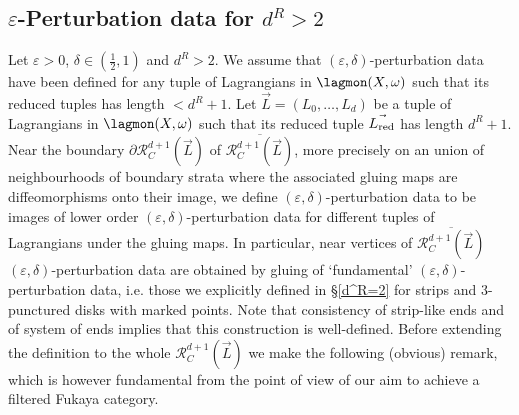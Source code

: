 	\subsection{$\varepsilon$-Perturbation data for $d^R>2$}\label{epspd3}
	Let $\varepsilon>0$, $\delta\in \left(\frac{1}{2},1\right)$ and $d^R>2$. We assume that $(\varepsilon,\delta)$-perturbation data have been defined for any tuple of Lagrangians in $\lagmon(X,\omega)$ such that its reduced tuples has length $<d^R+1$. Let $\vec{L}=(L_0,\ldots,L_d)$ be a tuple of Lagrangians in $\lagmon(X,\omega)$ such that its reduced tuple $\vec{L_\textnormal{red}}$ has length $d^R+1$. Near the boundary $\partial \mathcal{R}^{d+1}_C(\vec{L})$ of $\overline{\mathcal{R}^{d+1}_C(\vec{L})}$, more precisely on an union of neighbourhoods of boundary strata where the associated gluing maps are diffeomorphisms onto their image, we define $(\varepsilon,\delta)$-perturbation data to be images of lower order $(\varepsilon,\delta)$-perturbation data for different tuples of Lagrangians under the gluing maps. In particular, near vertices of $\overline{\mathcal{R}^{d+1}_C(\vec{L})}$ $(\varepsilon,\delta)$-perturbation data are obtained by gluing of `fundamental' $(\varepsilon,\delta)$-perturbation data, i.e. those we explicitly defined in \S \ref{d^R=2} for strips and $3$-punctured disks with marked points. Note that consistency of strip-like ends and of system of ends implies that this construction is well-defined. Before extending the definition to the whole $\mathcal{R}^{d+1}_C(\vec{L})$ we make the following (obvious) remark, which is however fundamental from the point of view of our aim to achieve a filtered Fukaya category.
	
